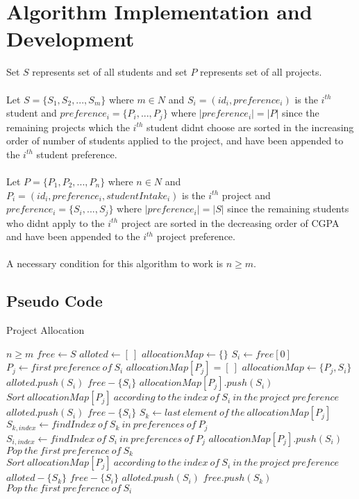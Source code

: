 \documentclass{article}
\begin{document}
\section{Algorithm Implementation and Development}
Set $S$ represents set of all students and set $P$ represents set of all projects.
\\ \\
Let $S = \{ S_1, S_2, ... , S_m \}$ 
where 
$m \in N$ 
and
$S_i = (id_i,preference_i)$ is the $i^{th}$ student
and
$preference_i = \{P_i, ... ,P_j\}$ where 
$|preference_i| = |P|$
since the remaining projects which the $i^{th}$ student didnt choose are sorted in the increasing order of number of students applied to the project, and have been appended to the $i^{th}$ student preference.
\\ \\
Let $P = \{P_1, P_2, ... , P_n\}$ 
where 
$n \in N$
and
$P_i = (id_i,preference_i,studentIntake_i)$ is the $i^{th}$ project 
and
$preference_i = \{S_i, ... ,S_j\}$ where 
$|preference_i| = |S|$
since the remaining students who didnt apply to the $i^{th}$ project are sorted in the decreasing order of CGPA and have been appended to the ${i^{th}}$ project preference.
\\ \\
A necessary condition for this algorithm to work is $n \geq m$.

\subsection{Pseudo Code}
\begin{algorithm}[H]
\caption{Project Allocation}
\begin{algorithmic}
\REQUIRE $n \geq m $
\STATE $free \leftarrow S$
\STATE $alloted \leftarrow [\:]$ 
\STATE $allocationMap \leftarrow \{\}$
\STATE $S_i \leftarrow free[0]$
\STATE $P_j \leftarrow first \: preference \: of \: S_i$
\STATE $allocationMap[P_j] = [\:]$
\STATE $allocationMap \leftarrow \{P_j,S_i\}$
\STATE $alloted.push(S_i)$
\STATE $free - \{S_i\}$
\ELSE 
{}
\STATE $allocationMap[P_j].push(S_i)$
\STATE $Sort \: allocationMap[P_j] \: according \: to \: the \: index \: of \: S_i \: in \: the \: project \: preference$
\STATE $alloted.push(S_i)$
\STATE $free - \{S_i\}$
\ELSE
\STATE $S_k \leftarrow last \: element \: of \: the \: allocationMap[P_j]$
\STATE $S_{k,index} \leftarrow  findIndex \: of \: S_k \: in \: preferences \: of \:P_j$ 
\STATE $S_{i,index} \leftarrow findIndex \: of \: S_i \: in\: preferences \: of \:P_j$
\STATE $allocationMap[P_j].push(S_i)$
\STATE $Pop \: the \: first \: preference \: of \: S_k$
\STATE $Sort \: allocationMap[P_j] \: according \: to \: the \: index \: of \: S_i \: in \: the \: project \: preference$
\STATE $alloted - \{S_k\}$
\STATE $free - \{S_i\}$
\STATE $alloted.push(S_i)$
\STATE $free.push(S_k)$
\ELSE
\STATE $ Pop \: the \: first \: preference \: of \: S_i$
\ENDIF
\ENDIF
\ENDIF
\ENDWHILE
\end{algorithmic}
\end{algorithm}
\end{document}
